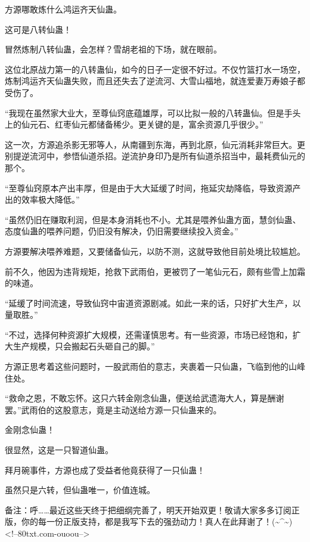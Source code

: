 \begin{this_body}
方源哪敢炼什么鸿运齐天仙蛊。

这可是八转仙蛊！

冒然炼制八转仙蛊，会怎样？雪胡老祖的下场，就在眼前。

这位北原战力第一的八转蛊仙，如今的日子一定很不好过。不仅竹篮打水一场空，炼制鸿运齐天仙蛊失败，而且还失去了逆流河、大雪山福地，就连爱妻万寿娘子都受伤了。

“我现在虽然家大业大，至尊仙窍底蕴雄厚，可以比拟一般的八转蛊仙。但是手头上的仙元石、红枣仙元都储备稀少。更关键的是，富余资源几乎很少。”

这一次，方源追杀影无邪等人，从南疆到东海，再到北原，仙元消耗非常巨大。更别提逆流河中，参悟仙道杀招。逆流护身印乃是所有仙道杀招当中，最耗费仙元的那个。

“至尊仙窍原本产出丰厚，但是由于大大延缓了时间，拖延灾劫降临，导致资源产出的效率极大降低。”

“虽然仍旧在赚取利润，但是本身消耗也不小。尤其是喂养仙蛊方面，慧剑仙蛊、态度仙蛊的喂养问题，仍旧没有解决，仍旧需要继续投入资金。”

方源要解决喂养难题，又要储备仙元，以防不测，这就导致他目前处境比较尴尬。

前不久，他因为违背规矩，抢救下武雨伯，更被罚了一笔仙元石，颇有些雪上加霜的味道。

“延缓了时间流速，导致仙窍中宙道资源剧减。如此一来的话，只好扩大生产，以量取胜。”

“不过，选择何种资源扩大规模，还需谨慎思考。有一些资源，市场已经饱和，扩大生产规模，只会搬起石头砸自己的脚。”

方源正思考着这些问题时，一股武雨伯的意志，夹裹着一只仙蛊，飞临到他的山峰住处。

“救命之恩，不敢忘怀。这只六转金刚念仙蛊，便送给武遗海大人，算是酬谢罢。”武雨伯的这股意志，竟是主动送给方源一只仙蛊来的。

金刚念仙蛊！

很显然，这是一只智道仙蛊。

拜月碗事件，方源也成了受益者他竟获得了一只仙蛊！

虽然只是六转，但仙蛊唯一，价值连城。

备注：呼……最近这些天终于把细纲完善了，明天开始双更！敬请大家多多订阅正版，你的每一份正版支持，都是我写下去的强劲动力！真人在此拜谢了！(\~{}\^{}\~{})<!--80txt.com-ouoou-->

\end{this_body}

